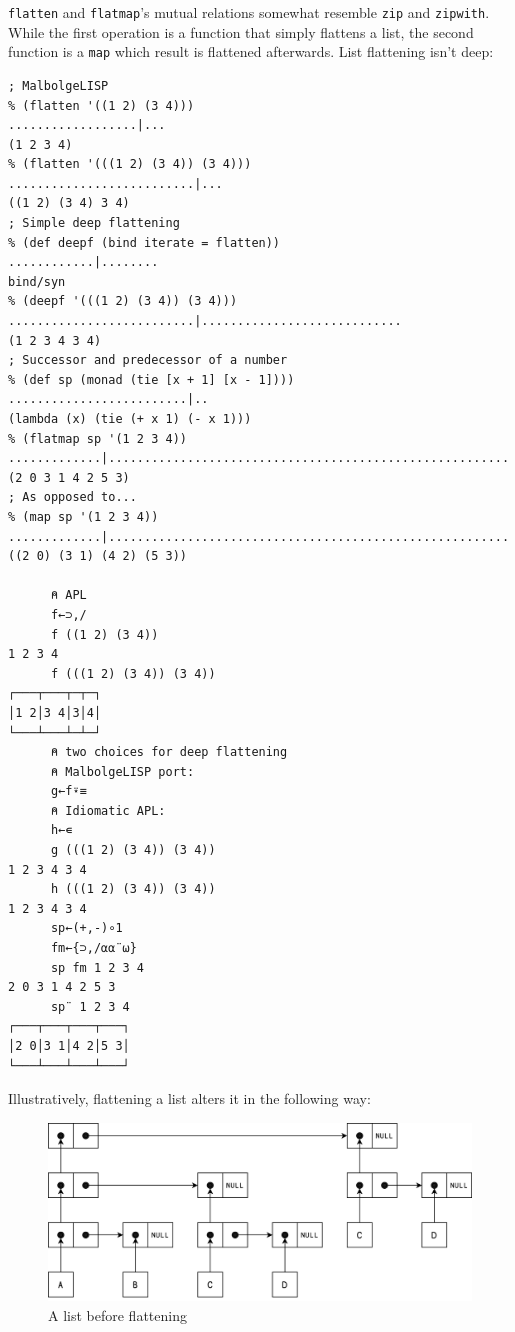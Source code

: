 \par \verb|flatten| and \verb|flatmap|'s mutual relations somewhat resemble \verb|zip| and \verb|zipwith|. While the first operation is a function that simply flattens a list, the second function is a \verb|map| which result is flattened afterwards. List flattening isn't deep:

\begin{verbatim}
; MalbolgeLISP
% (flatten '((1 2) (3 4)))
..................|...
(1 2 3 4)
% (flatten '(((1 2) (3 4)) (3 4)))
..........................|...
((1 2) (3 4) 3 4)
; Simple deep flattening
% (def deepf (bind iterate = flatten))
............|........
bind/syn
% (deepf '(((1 2) (3 4)) (3 4)))
..........................|............................
(1 2 3 4 3 4)
; Successor and predecessor of a number
% (def sp (monad (tie [x + 1] [x - 1])))
.........................|..
(lambda (x) (tie (+ x 1) (- x 1)))
% (flatmap sp '(1 2 3 4))
.............|........................................................
(2 0 3 1 4 2 5 3)
; As opposed to...
% (map sp '(1 2 3 4))
.............|........................................................
((2 0) (3 1) (4 2) (5 3))

      ⍝ APL
      f←⊃,/
      f ((1 2) (3 4))
1 2 3 4
      f (((1 2) (3 4)) (3 4))
┌───┬───┬─┬─┐
│1 2│3 4│3│4│
└───┴───┴─┴─┘
      ⍝ two choices for deep flattening
      ⍝ MalbolgeLISP port:
      g←f⍣≡
      ⍝ Idiomatic APL:
      h←∊
      g (((1 2) (3 4)) (3 4))
1 2 3 4 3 4
      h (((1 2) (3 4)) (3 4))
1 2 3 4 3 4
      sp←(+,-)∘1
      fm←{⊃,/⍺⍺¨⍵}
      sp fm 1 2 3 4
2 0 3 1 4 2 5 3
      sp¨ 1 2 3 4
┌───┬───┬───┬───┐
│2 0│3 1│4 2│5 3│
└───┴───┴───┴───┘
\end{verbatim}

Illustratively, flattening a list alters it in the following way:

\begin{figure}[H]
\centering
\includegraphics[width=\textwidth]{figures/beforeFlatten.png}
\caption{A list before flattening}
\end{figure}

